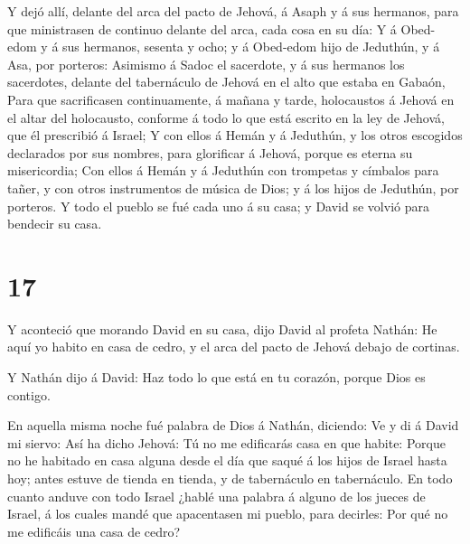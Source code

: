  Y dejó allí, delante del arca del pacto de Jehová, á Asaph
y á sus hermanos, para que ministrasen de continuo delante del arca,
cada cosa en su día:  Y á Obed-edom y á sus hermanos,
sesenta y ocho; y á Obed-edom hijo de Jeduthún, y á Asa, por porteros:
 Asimismo á Sadoc el sacerdote, y á sus hermanos los
sacerdotes, delante del tabernáculo de Jehová en el alto que estaba en
Gabaón,  Para que sacrificasen continuamente, á mañana y
tarde, holocaustos á Jehová en el altar del holocausto, conforme á todo
lo que está escrito en la ley de Jehová, que él prescribió á Israel;
 Y con ellos á Hemán y á Jeduthún, y los otros escogidos
declarados por sus nombres, para glorificar á Jehová, porque es eterna
su misericordia;  Con ellos á Hemán y á Jeduthún con
trompetas y címbalos para tañer, y con otros instrumentos de música de
Dios; y á los hijos de Jeduthún, por porteros.  Y todo el
pueblo se fué cada uno á su casa; y David se volvió para bendecir su
casa.

\hypertarget{section-16}{%
\section{17}\label{section-16}}

 Y aconteció que morando David en su casa, dijo David al
profeta Nathán: He aquí yo habito en casa de cedro, y el arca del pacto
de Jehová debajo de cortinas.

 Y Nathán dijo á David: Haz todo lo que está en tu corazón,
porque Dios es contigo.

 En aquella misma noche fué palabra de Dios á Nathán,
diciendo:  Ve y di á David mi siervo: Así ha dicho Jehová:
Tú no me edificarás casa en que habite:  Porque no he
habitado en casa alguna desde el día que saqué á los hijos de Israel
hasta hoy; antes estuve de tienda en tienda, y de tabernáculo en
tabernáculo.  En todo cuanto anduve con todo Israel ¿hablé
una palabra á alguno de los jueces de Israel, á los cuales mandé que
apacentasen mi pueblo, para decirles: Por qué no me edificáis una casa
de cedro?

